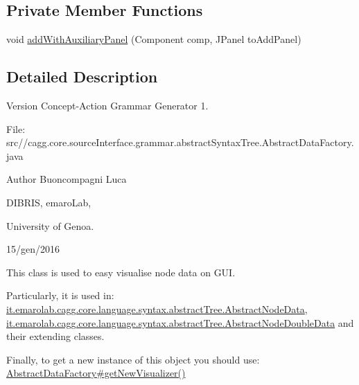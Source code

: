 \subsection*{Private Member Functions}
\begin{DoxyCompactItemize}
\item 
void \hyperlink{classit_1_1emarolab_1_1cagg_1_1core_1_1language_1_1syntax_1_1abstractTree_1_1AbstractDataFactory_1_1DataFactoryVisualizer_ae371317cf45e3911965d0ae5c696596a}{add\-With\-Auxiliary\-Panel} (Component comp, J\-Panel to\-Add\-Panel)
\end{DoxyCompactItemize}


\subsection{Detailed Description}
\begin{DoxyVersion}{Version}
Concept-\/\-Action Grammar Generator 1. \par
 File\-: src//cagg.core.\-source\-Interface.\-grammar.\-abstract\-Syntax\-Tree.\-Abstract\-Data\-Factory.\-java \par

\end{DoxyVersion}
\begin{DoxyAuthor}{Author}
Buoncompagni Luca \par
 D\-I\-B\-R\-I\-S, emaro\-Lab,\par
 University of Genoa. \par
 15/gen/2016 \par

\end{DoxyAuthor}


This class is used to easy visualise node data on G\-U\-I.\par
 Particularly, it is used in\-: \hyperlink{}{it.\-emarolab.\-cagg.\-core.\-language.\-syntax.\-abstract\-Tree.\-Abstract\-Node\-Data}, \hyperlink{}{it.\-emarolab.\-cagg.\-core.\-language.\-syntax.\-abstract\-Tree.\-Abstract\-Node\-Double\-Data} and their extending classes.\par
 Finally, to get a new instance of this object you should use\-: \hyperlink{classit_1_1emarolab_1_1cagg_1_1core_1_1language_1_1syntax_1_1abstractTree_1_1AbstractDataFactory_a9c05a46a56ca0069762aeefcda1b520a}{Abstract\-Data\-Factory\#get\-New\-Visualizer()} 


